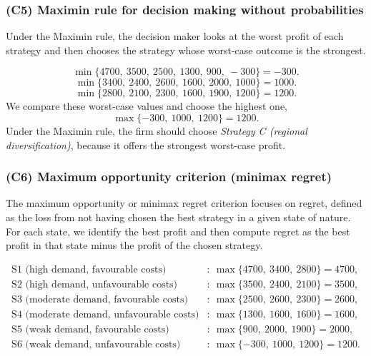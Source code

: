 	\subsubsection{(C5) Maximin rule for decision making without probabilities}\label{subsubsec:example2-c5}
	
	Under the Maximin rule, the decision maker looks at the worst profit of each strategy and then chooses the strategy whose worst-case outcome is the strongest.
	
	\[
	\min\{4700,\ 3500,\ 2500,\ 1300,\ 900,\ -300\}=-300.
	\]
	\[
	\min\{3400,\ 2400,\ 2600,\ 1600,\ 2000,\ 1000\}=1000.
	\]
	\[
	\min\{2800,\ 2100,\ 2300,\ 1600,\ 1900,\ 1200\}=1200.
	\]
	We compare these worst-case values and choose the highest one,
	\[
	\max\{-300,\ 1000,\ 1200\}=1200.
	\]
	Under the Maximin rule, the firm should choose \emph{Strategy C (regional diversification)}, because it offers the strongest worst-case profit.
	
	\subsubsection{(C6) Maximum opportunity criterion (minimax regret)}\label{subsubsec:example2-c6}
	
	The maximum opportunity or minimax regret criterion focuses on regret, defined as the loss from not having chosen the best strategy in a given state of nature. For each state, we identify the best profit and then compute regret as the best profit in that state minus the profit of the chosen strategy.
	
	\[
	\begin{aligned}
		\text{S1 (high demand, favourable costs)} &:\ \max\{4700,\ 3400,\ 2800\}=4700,\\
		\text{S2 (high demand, unfavourable costs)} &:\ \max\{3500,\ 2400,\ 2100\}=3500,\\
		\text{S3 (moderate demand, favourable costs)} &:\ \max\{2500,\ 2600,\ 2300\}=2600,\\
		\text{S4 (moderate demand, unfavourable costs)} &:\ \max\{1300,\ 1600,\ 1600\}=1600,\\
		\text{S5 (weak demand, favourable costs)} &:\ \max\{900,\ 2000,\ 1900\}=2000,\\
		\text{S6 (weak demand, unfavourable costs)} &:\ \max\{-300,\ 1000,\ 1200\}=1200.
	\end{aligned}
	\]
	
